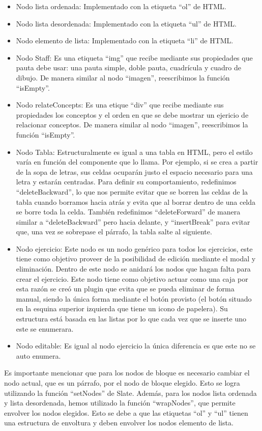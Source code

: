 \begin{itemize}
  \item Nodo lista ordenada: Implementado con la etiqueta ``ol'' de HTML.
  \item Nodo lista desordenada: Implementado con la etiqueta ``ul'' de HTML.
  \item Nodo elemento de lista: Implementado con la etiqueta ``li'' de HTML.
  \item Nodo Staff: Es una etiqueta ``img'' que recibe mediante sus propiedades que pauta debe usar: una pauta simple, doble pauta, cuadrícula y cuadro de dibujo. De manera similar al nodo ``imagen'', reescribimos la función ``isEmpty''.
  \item Nodo relateConcepts: Es una etique ``div'' que recibe mediante sus propiedades los conceptos y el orden en que se debe mostrar un ejericio de relacionar conceptos. De manera similar al nodo ``imagen'', reescribimos la función ``isEmpty''.
  \item Nodo Tabla: Estructuralmente es igual a una tabla en HTML, pero el estilo varía en función del componente que lo llama. Por ejemplo, si se crea a partir de la sopa de letras, sus celdas ocuparán justo el espacio necesario para una letra y estarán centradas. Para definir su comportamiento, redefinimos ``deleteBackward'', lo que nos permite evitar que se borren las celdas de la tabla cuando borramos hacia atrás y evita que al borrar dentro de una celda se borre toda la celda. También redefinimos ``deleteForward'' de manera similar a ``deleteBackward'' pero hacia delante, y ``insertBreak'' para evitar que, una vez se sobrepase el párrafo, la tabla salte al siguiente.
  \item Nodo ejercicio: Este nodo es un nodo genérico para todos los ejercicios, este tiene como objetivo proveer de la posibilidad de edición mediante el modal y eliminación. Dentro de este nodo se anidará los nodos que hagan falta para crear el ejercicio. Este nodo tiene como objetivo actuar como una caja por esta razón se creó un plugin que evita que se pueda eliminar de forma manual, siendo la única forma mediante el botón provisto (el botón situado en la esquina superior izquierda que tiene un icono de papelera). Su estructura está basada
        en las listas por lo que cada vez que se inserte uno este se enumerara.
  \item Nodo editable: Es igual al nodo ejercicio la única diferencia es que este no se auto enumera.
\end{itemize}

Es importante mencionar que para los nodos de bloque es necesario cambiar el nodo actual, que es un párrafo, por el nodo de bloque elegido. Esto se logra utilizando la función ``setNodes'' de Slate. Además, para los nodos lista ordenada y lista desordenada, hemos utilizado la función ``wrapNodes'', que permite envolver los nodos elegidos. Esto se debe a que las etiquetas ``ol'' y ``ul'' tienen una estructura de envoltura y deben envolver los nodos elemento de lista.



